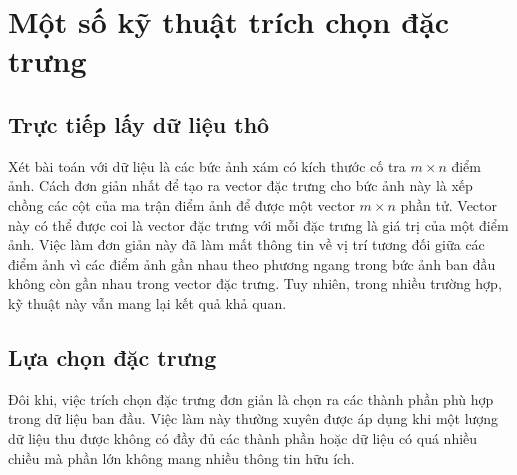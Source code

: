  
 
\section{Một số kỹ thuật trích chọn đặc trưng}
 
\subsection{Trực tiếp lấy dữ liệu thô}

Xét bài toán với dữ liệu là các bức ảnh xám có kích thước cố tra $m\times n$
điểm ảnh. Cách đơn giản nhất để tạo ra vector đặc trưng cho bức ảnh này là xếp
chồng các cột của ma trận điểm ảnh để được một vector $m\times n$ phần tử.
Vector này có thể được coi là vector đặc trưng với mỗi đặc trưng là giá trị của
một điểm ảnh. Việc làm đơn giản này đã làm mất {thông tin về vị trí tương đối}
giữa các điểm ảnh vì các điểm ảnh gần nhau theo phương ngang trong bức ảnh ban
đầu không còn gần nhau trong vector đặc trưng. Tuy nhiên, trong
nhiều trường hợp, kỹ thuật này vẫn mang lại kết quả khả quan.
 
\subsection{Lựa chọn đặc trưng}
Đôi khi, việc trích chọn đặc trưng đơn giản là chọn ra các thành phần phù hợp trong dữ liệu ban đầu. Việc làm này thường xuyên được áp dụng khi một lượng dữ liệu thu được không có đầy đủ các thành phần hoặc dữ liệu có quá nhiều chiều mà phần lớn không mang nhiều thông tin hữu ích. 
 
